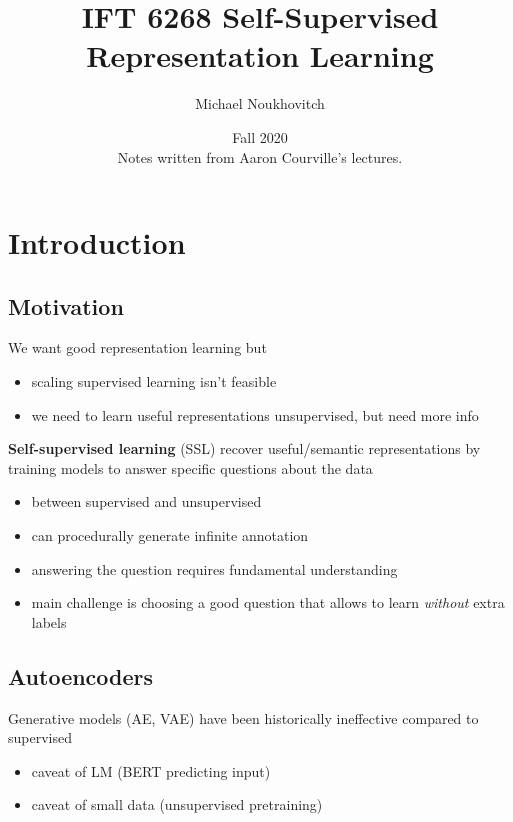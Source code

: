 \documentclass[]{article}
\theoremstyle{definition}
\begin{document}
    \let\ref\Cref

    \title{\bf{IFT 6268 Self-Supervised Representation Learning}}
    \date{Fall 2020 \\ \center Notes written from Aaron Courville's lectures.}
    \author{Michael Noukhovitch}

    \maketitle
    \newpage
    \tableofcontents
    \newpage


    \section{Introduction}

    \subsection{Motivation}%
    \label{sub:motivation}

    We want good representation learning but
    \begin{itemize}
        \item scaling supervised learning isn't feasible
        \item we need to learn useful representations unsupervised, but need more info
    \end{itemize}

    \textbf{Self-supervised learning} (SSL) recover useful/semantic representations by training models to answer specific questions about the data
    \begin{itemize}
        \item between supervised and unsupervised
        \item can procedurally generate infinite annotation
        \item answering the question requires fundamental understanding
        \item main challenge is choosing a good question that allows to learn \textit{without} extra labels
    \end{itemize}

    \subsection{Autoencoders}%
    \label{sub:autoencoders}

    Generative models (AE, VAE) have been historically ineffective compared to supervised
    \begin{itemize}
        \item caveat of LM (BERT predicting input)
        \item caveat of small data (unsupervised pretraining)
    \end{itemize}
\end{document}
